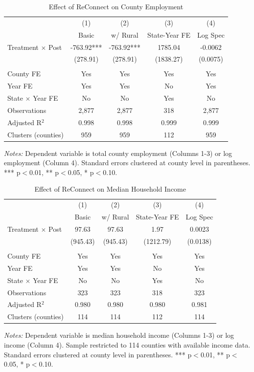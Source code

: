 \documentclass[12pt]{article}
\begin{document}
\begin{table}[H]
\centering
\caption{Effect of ReConnect on County Employment}
\label{tab:employment_main}
\begin{tabular}{lcccc}
\toprule
& (1) & (2) & (3) & (4) \\
& Basic & w/ Rural & State-Year FE & Log Spec \\
\midrule
Treatment $\times$ Post & -763.92*** & -763.92*** & 1785.04 & -0.0062 \\
& (278.91) & (278.91) & (1838.27) & (0.0075) \\
\\
County FE & Yes & Yes & Yes & Yes \\
Year FE & Yes & Yes & No & Yes \\
State $\times$ Year FE & No & No & Yes & No \\
\midrule
Observations & 2,877 & 2,877 & 318 & 2,877 \\
Adjusted R$^2$ & 0.998 & 0.998 & 0.999 & 0.999 \\
Clusters (counties) & 959 & 959 & 112 & 959 \\
\bottomrule
\end{tabular}
\begin{tablenotes}
\small
\item \textit{Notes:} Dependent variable is total county employment (Columns 1-3) or log employment (Column 4). Standard errors clustered at county level in parentheses. *** p$<$0.01, ** p$<$0.05, * p$<$0.10.
\end{tablenotes}
\end{table}

\begin{table}[H]
\centering
\caption{Effect of ReConnect on Median Household Income}
\label{tab:income_main}
\begin{tabular}{lcccc}
\toprule
& (1) & (2) & (3) & (4) \\
& Basic & w/ Rural & State-Year FE & Log Spec \\
\midrule
Treatment $\times$ Post & 97.63 & 97.63 & 1.97 & 0.0023 \\
& (945.43) & (945.43) & (1212.79) & (0.0138) \\
\\
County FE & Yes & Yes & Yes & Yes \\
Year FE & Yes & Yes & No & Yes \\
State $\times$ Year FE & No & No & Yes & No \\
\midrule
Observations & 323 & 323 & 318 & 323 \\
Adjusted R$^2$ & 0.980 & 0.980 & 0.980 & 0.981 \\
Clusters (counties) & 114 & 114 & 112 & 114 \\
\bottomrule
\end{tabular}
\begin{tablenotes}
\small
\item \textit{Notes:} Dependent variable is median household income (Columns 1-3) or log income (Column 4). Sample restricted to 114 counties with available income data. Standard errors clustered at county level in parentheses. *** p$<$0.01, ** p$<$0.05, * p$<$0.10.
\end{tablenotes}
\end{table}
\end{document}
